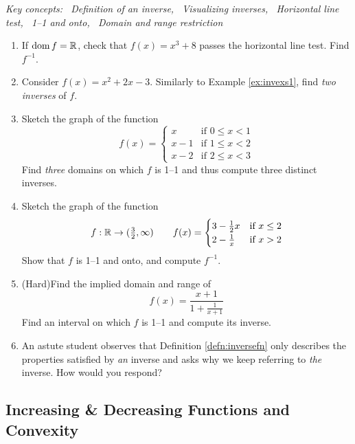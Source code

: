 \begin{exercises}{}{}
	\hangindent\leftmargini
	\emph{Key concepts: \ Definition of an inverse, \ Visualizing inverses, \ Horizontal line test, \ 1--1 and onto, \ Domain and range restriction}
	
	\begin{enumerate}
	  \item If $\operatorname{dom} f=\mathbb{R}$, check that $f(x)=x^3+8$ passes the horizontal line test. Find $f^{-1}$.


	  \item Consider $f(x)=x^2+2x-3$. Similarly to Example \ref{ex:invexs1}, find \emph{two inverses} of $f$.
	  
	  
	  \item Sketch the graph of the function
	  \[
	  	f(x)=
	  	\begin{cases}
	  		x&\text{if }0\le x<1\\
	  		x-1&\text{if }1\le x<2\\
	  		x-2&\text{if }2\le x<3
	  	\end{cases}
	  \]
		Find \emph{three} domains on which $f$ is 1--1 and thus compute three distinct inverses.
	
	
	  \item Sketch the graph of the function
	  \[
	  	f:\mathbb{R}\to(\tfrac 32,\infty)
	  	\qquad 
	  	f(x)=
	  	\begin{cases}
	  		3-\frac 12x&\text{if }x\le 2\\
	  		2-\frac 1x&\text{if }x>2
	  	\end{cases}
	  \]
	 	Show that $f$ is 1--1 and onto, and compute $f^{-1}$.
	 	 
	  
	  \item (Hard)\lstsp Find the implied domain and range of
	  \[
	  	f(x)=\frac{x+1}{1+\frac 1{x+1}}
	  \]
	  Find an interval on which $f$ is 1--1 and compute its inverse.
	  
	  
	  \item An astute student observes that Definition \ref{defn:inversefn} only describes the properties satisfied by \emph{an} inverse and asks why we keep referring to \emph{the} inverse. How would you respond?
	  
	\end{enumerate}
\end{exercises}

\clearpage




\iffalse



\subsection{Increasing \& Decreasing Functions and Convexity}



